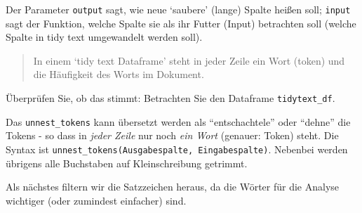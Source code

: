 \documentclass[12pt,ngerman,]{book}
\makeatletter
\newenvironment{Shaded}{\begin{snugshade}}{\end{snugshade}}
\newcommand{\KeywordTok}[1]{\textcolor[rgb]{0.13,0.29,0.53}{\textbf{#1}}}
\newcommand{\DataTypeTok}[1]{\textcolor[rgb]{0.13,0.29,0.53}{#1}}
\newcommand{\StringTok}[1]{\textcolor[rgb]{0.31,0.60,0.02}{#1}}
\newcommand{\CommentTok}[1]{\textcolor[rgb]{0.56,0.35,0.01}{\textit{#1}}}
\newcommand{\OperatorTok}[1]{\textcolor[rgb]{0.81,0.36,0.00}{\textbf{#1}}}
\newcommand{\NormalTok}[1]{#1}
\newenvironment{kframe}{%
\medskip{}
\setlength{\fboxsep}{.8em}
 \def\at@end@of@kframe{}%
 \ifinner\ifhmode%
  \def\at@end@of@kframe{\end{minipage}}%
  \begin{minipage}{\columnwidth}%
 \fi\fi%
 \def\FrameCommand##1{\hskip\@totalleftmargin \hskip-\fboxsep
 \colorbox{shadecolor}{##1}\hskip-\fboxsep
     \hskip-\linewidth \hskip-\@totalleftmargin \hskip\columnwidth}%
 \MakeFramed {\advance\hsize-\width
   \@totalleftmargin\z@ \linewidth\hsize
   \@setminipage}}%
 {\par\unskip\endMakeFramed%
 \at@end@of@kframe}
\renewenvironment{Shaded}{\begin{kframe}}{\end{kframe}}
\theoremstyle{definition}
\theoremstyle{definition}
\theoremstyle{remark}
\makeatother
\begin{document}
\begin{Shaded}
\end{Shaded}

Der Parameter \texttt{output} sagt, wie neue `saubere' (lange) Spalte
heißen soll; \texttt{input} sagt der Funktion, welche Spalte sie als ihr
Futter (Input) betrachten soll (welche Spalte in tidy text umgewandelt
werden soll).

\begin{quote}
In einem `tidy text Dataframe' steht in jeder Zeile ein Wort (token) und
die Häufigkeit des Worts im Dokument.
\end{quote}

Überprüfen Sie, ob das stimmt: Betrachten Sie den Dataframe
\texttt{tidytext\_df}.

Das \texttt{unnest\_tokens} kann übersetzt werden als ``entschachtele''
oder ``dehne'' die Tokens - so dass in \emph{jeder Zeile} nur noch
\emph{ein Wort} (genauer: Token) steht. Die Syntax ist
\texttt{unnest\_tokens(Ausgabespalte,\ Eingabespalte)}. Nebenbei werden
übrigens alle Buchstaben auf Kleinschreibung getrimmt.

Als nächstes filtern wir die Satzzeichen heraus, da die Wörter für die
Analyse wichtiger (oder zumindest einfacher) sind.

\begin{Shaded}
\end{Shaded}
\end{document}
